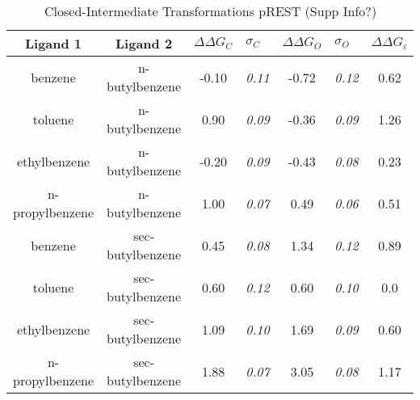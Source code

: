 \documentclass[T4paper.tex]{subfiles}
\begin{document}
\begin{table}[!htb]
\centering
\caption{Closed-Intermediate Transformations pREST (Supp Info?)}
\label{tbl:C-I_pREST}
\begin{tabular}{|c|c|c|l|c|l|c|}
\hline
\textbf{Ligand 1}       & \textbf{Ligand 2}    & {\color[HTML]{800080} \boldmath$\Delta\Delta G_{C}$} & {\color[HTML]{800080} \boldmath$\sigma_{C}$} & {\color[HTML]{008000} \boldmath$\Delta\Delta G_{O}$} & {\color[HTML]{008000} \boldmath$\sigma_{O}$} & \boldmath$\Delta\Delta G_{\varepsilon}$ \\ \hline
\cellcolor[HTML]{800080}benzene         & \cellcolor[HTML]{00FFFF}n-butylbenzene   & -0.10                                   & \textit{0.11}                       & -0.72                                & \textit{0.12}                       & \cellcolor[HTML]{9AFF99}0.62 \\ \hline
\cellcolor[HTML]{800080}toluene         & \cellcolor[HTML]{00FFFF}n-butylbenzene   & 0.90                                  & \textit{0.09}                       & -0.36                                & \textit{0.09}                       & \cellcolor[HTML]{FFCCC9}1.26 \\ \hline
\cellcolor[HTML]{800080}ethylbenzene    & \cellcolor[HTML]{00FFFF}n-butylbenzene   & -0.20                                   & \textit{0.09}                       & -0.43                                & \textit{0.08}                       & \cellcolor[HTML]{9AFF99}0.23 \\ \hline
\cellcolor[HTML]{800080}n-propylbenzene & \cellcolor[HTML]{00FFFF}n-butylbenzene   & 1.00                                  & \textit{0.07}                       & 0.49                                 & \textit{0.06}                       & \cellcolor[HTML]{9AFF99}0.51 \\ \hline
\cellcolor[HTML]{800080}benzene         & \cellcolor[HTML]{00FFFF}sec-butylbenzene & 0.45                                   & \textit{0.08}                       & 1.34                                 & \textit{0.12}                       & \cellcolor[HTML]{9AFF99}0.89 \\ \hline
\cellcolor[HTML]{800080}toluene         & \cellcolor[HTML]{00FFFF}sec-butylbenzene & 0.60                                   & \textit{0.12}                       & 0.60                                 & \textit{0.10}                       & \cellcolor[HTML]{9AFF99}0.0 \\ \hline
\cellcolor[HTML]{800080}ethylbenzene    & \cellcolor[HTML]{00FFFF}sec-butylbenzene & 1.09                                   & \textit{0.10}                       & 1.69                                 & \textit{0.09}                       & \cellcolor[HTML]{9AFF99}0.60 \\ \hline
\cellcolor[HTML]{800080}n-propylbenzene & \cellcolor[HTML]{00FFFF}sec-butylbenzene & 1.88                                   & \textit{0.07}                       & 3.05                                 & \textit{0.08}                       & \cellcolor[HTML]{FFCCC9}1.17 \\ \hline
\end{tabular}
\end{table}
\end{document}
